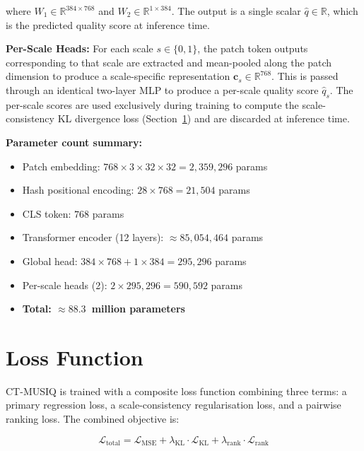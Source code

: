 where $W_1 \in \mathbb{R}^{384 \times 768}$ and $W_2 \in \mathbb{R}^{1 \times 384}$.
The output is a single scalar $\hat{q} \in \mathbb{R}$, which is the predicted quality
score at inference time.

\textbf{Per-Scale Heads:} For each scale $s \in \{0, 1\}$, the patch token outputs
corresponding to that scale are extracted and mean-pooled along the patch dimension to
produce a scale-specific representation $\mathbf{c}_s \in \mathbb{R}^{768}$. This is
passed through an identical two-layer MLP to produce a per-scale quality score
$\hat{q}_s$. The per-scale scores are used exclusively during training to compute the
scale-consistency KL divergence loss (Section~\ref{sec:loss}) and are discarded at
inference time.

\textbf{Parameter count summary:}
\begin{itemize}
    \item Patch embedding: $768 \times 3 \times 32 \times 32 = 2{,}359{,}296$ params
    \item Hash positional encoding: $28 \times 768 = 21{,}504$ params
    \item CLS token: $768$ params
    \item Transformer encoder (12 layers): $\approx 85{,}054{,}464$ params
    \item Global head: $384 \times 768 + 1 \times 384 = 295{,}296$ params
    \item Per-scale heads (2): $2 \times 295{,}296 = 590{,}592$ params
    \item \textbf{Total: $\approx 88.3$~million parameters}
\end{itemize}


\section{Loss Function}
\label{sec:loss}

CT-MUSIQ is trained with a composite loss function combining three terms: a primary
regression loss, a scale-consistency regularisation loss, and a pairwise ranking loss.
The combined objective is:

\begin{equation}
    \mathcal{L}_{\text{total}} = \mathcal{L}_{\text{MSE}}
                               + \lambda_{\text{KL}} \cdot \mathcal{L}_{\text{KL}}
                               + \lambda_{\text{rank}} \cdot \mathcal{L}_{\text{rank}}
    \label{eq:total_loss}
\end{equation}

